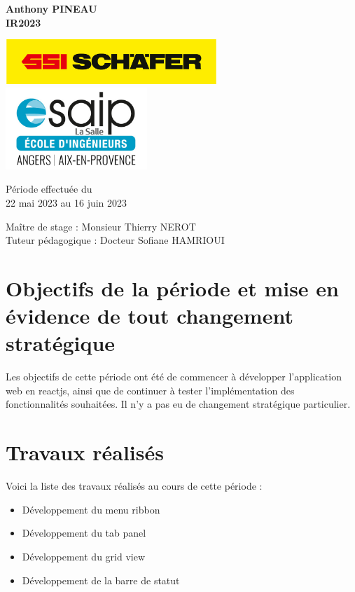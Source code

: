 \documentclass[a4paper, 12pt, french]{article}
\newcommand{\bdot}{\item[\color{ssiYellow}\ding{108}]}
\begin{document}
\begin{titlepage}
\begin{center}
			\textbf{Anthony PINEAU}\\
			\textbf{IR2023}

			\vfill

			\includegraphics[width=0.6\textwidth]{../images/schaefer.jpg}
			\vfill
			\includegraphics[width=0.4\textwidth]{../images/esaip.jpg}

			\vfill

			Période effectuée du\\
			22 mai 2023 au 16 juin 2023

			\vspace{0.8cm}
			
			\Large
			Maître de stage : Monsieur Thierry NEROT\\
			Tuteur pédagogique : Docteur Sofiane HAMRIOUI\\
		\end{center}
	\end{titlepage}
		
	\newpage
	
	\doublespacing
	\tableofcontents
	
	\listoffigures
	
	\newpage
		
	
	\singlespacing

	\section{Objectifs de la période et mise en évidence de tout changement stratégique}
		Les objectifs de cette période ont été de commencer à développer l'application web en reactjs, ainsi que de continuer à tester l'implémentation des fonctionnalités souhaitées. Il n'y a pas eu de changement stratégique particulier.

	\section{Travaux réalisés}
		Voici la liste des travaux réalisés au cours de cette période :
		\begin{itemize}
			\bdot{Développement du menu ribbon}
			\bdot{Développement du tab panel}
			\bdot{Développement du grid view}
			\bdot{Développement de la barre de statut}
		\end{itemize}		
\end{document}
